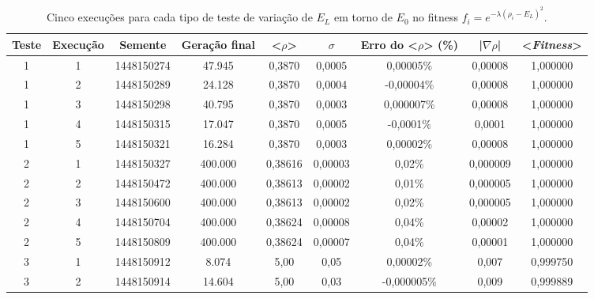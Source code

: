 	\begin{landscape}
\begin{center}	
\begin{table}[htbp]
\caption{Cinco execuções para cada tipo de teste de variação de $E_L$ em torno de $E_0$ no fitness $f_i = e^{-\lambda(\rho_i - E_L)^2}$.}
\label{tab:VariandoELCincoExecucoes}
\centering
\begin{tabular}{ccccccccc}
\hline \hline
\textbf{Teste} & \textbf{Execução} & \textbf{Semente} & \textbf{Geração final} & \textbf{<$\rho$>} & \textbf{$\sigma$} & \textbf{Erro do <$\rho$> (\%)} & \textbf{|$\nabla \rho$|} & \textbf{<\emph{Fitness}>} \\
\hline \hline
         1 &          1 & 1448150274 &     47.945 &     0,3870 &     0,0005 &  0,00005\% &    0,00008 &   1,000000 \\
\hline
         1 &          2 & 1448150289 &     24.128 &     0,3870 &     0,0004 & -0,00004\% &    0,00008 &   1,000000 \\
\hline
         1 &          3 & 1448150298 &     40.795 &     0,3870 &     0,0003 & 0,000007\% &    0,00008 &   1,000000 \\
\hline
         1 &          4 & 1448150315 &     17.047 &     0,3870 &     0,0005 &  -0,0001\% &     0,0001 &   1,000000 \\
\hline
         1 &          5 & 1448150321 &     16.284 &     0,3870 &     0,0003 &  0,00002\% &    0,00008 &   1,000000 \\
\hline \hline
         2 &          1 & 1448150327 &    400.000 &    0,38616 &    0,00003 &     0,02\% &   0,000009 &   1,000000 \\
\hline
         2 &          2 & 1448150472 &    400.000 &    0,38613 &    0,00002 &     0,01\% &   0,000005 &   1,000000 \\
\hline
         2 &          3 & 1448150600 &    400.000 &    0,38613 &    0,00002 &     0,02\% &   0,000005 &   1,000000 \\
\hline
         2 &          4 & 1448150704 &    400.000 &    0,38624 &    0,00008 &     0,04\% &    0,00002 &   1,000000 \\
\hline
         2 &          5 & 1448150809 &    400.000 &    0,38624 &    0,00007 &     0,04\% &    0,00001 &   1,000000 \\
\hline \hline
         3 &          1 & 1448150912 &      8.074 &       5,00 &       0,05 &  0,00002\% &      0,007 &   0,999750 \\
\hline
         3 &          2 & 1448150914 &     14.604 &       5,00 &       0,03 & -0,000005\% &      0,009 &   0,999889 \\

\end{tabular}
\end{table}
\end{center}
\end{landscape}
